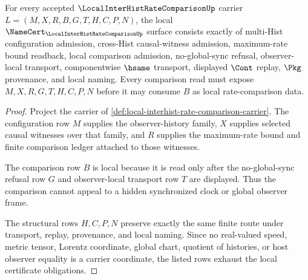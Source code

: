 \begin{theorem}
\label{thm:local-interhist-rate-comparison-namecert-obligations}
For every accepted $\LocalInterHistRateComparisonUp$ carrier $L=(M,X,R,B,G,T,H,C,P,N)$, the local $\NameCert_{\LocalInterHistRateComparisonUp}$ surface consists exactly of multi-Hist configuration admission, cross-Hist causal-witness admission, maximum-rate bound readback, local comparison admission, no-global-sync refusal, observer-local transport, componentwise $\hsame$ transport, displayed $\Cont$ replay, $\Pkg$ provenance, and local naming. Every comparison read must expose $M,X,R,G,T,H,C,P,N$ before it may consume $B$ as local rate-comparison data.
\end{theorem}
\begin{proof}
Project the carrier of \autoref{def:local-interhist-rate-comparison-carrier}. The configuration row $M$ supplies the observer-history family, $X$ supplies selected causal witnesses over that family, and $R$ supplies the maximum-rate bound and finite comparison ledger attached to those witnesses.

The comparison row $B$ is local because it is read only after the no-global-sync refusal row $G$ and observer-local transport row $T$ are displayed. Thus the comparison cannot appeal to a hidden synchronized clock or global observer frame.

The structural rows $H,C,P,N$ preserve exactly the same finite route under transport, replay, provenance, and local naming. Since no real-valued speed, metric tensor, Lorentz coordinate, global chart, quotient of histories, or host observer equality is a carrier coordinate, the listed rows exhaust the local certificate obligations.
\end{proof}

